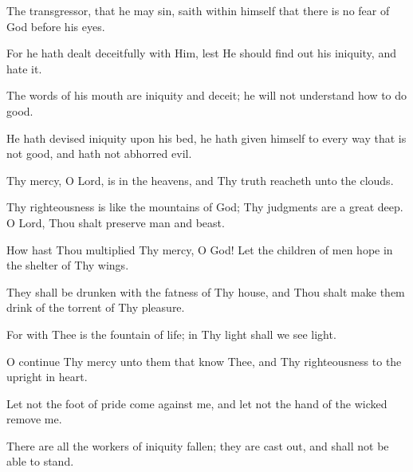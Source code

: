 The transgressor, that he may sin, saith within himself that there is no fear of God before his eyes.

For he hath dealt deceitfully with Him, lest He should find out his iniquity, and hate it.

The words of his mouth are iniquity and deceit; he will not understand how to do good.

He hath devised iniquity upon his bed, he hath given himself to every way that is not good, and hath not abhorred evil.

Thy mercy, O Lord, is in the heavens, and Thy truth reacheth unto the clouds.

Thy righteousness is like the mountains of God; Thy judgments are a great deep. O Lord, Thou shalt preserve man and beast.

How hast Thou multiplied Thy mercy, O God! Let the children of men hope in the shelter of Thy wings.

They shall be drunken with the fatness of Thy house, and Thou shalt make them drink of the torrent of Thy pleasure.

For with Thee is the fountain of life; in Thy light shall we see light.

O continue Thy mercy unto them that know Thee, and Thy righteousness to the upright in heart.

Let not the foot of pride come against me, and let not the hand of the wicked remove me.

There are all the workers of iniquity fallen; they are cast out, and shall not be able to stand.
